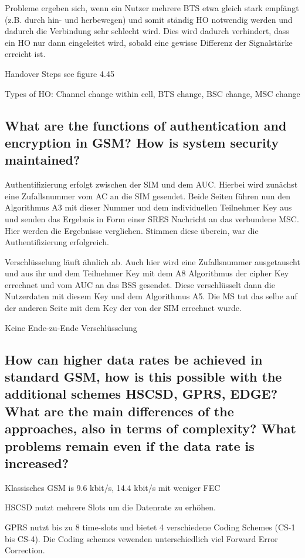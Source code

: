 Probleme ergeben sich, wenn ein Nutzer mehrere BTS etwa gleich stark empfängt (z.B. durch hin- und herbewegen) und somit ständig HO notwendig werden und dadurch die Verbindung sehr schlecht wird. Dies wird dadurch verhindert, dass ein HO nur dann eingeleitet wird, sobald eine gewisse Differenz der Signalstärke erreicht ist.

Handover Steps see figure 4.45

Types of HO: Channel change within cell, BTS change, BSC change, MSC change

\subsection{What are the functions of authentication and encryption in GSM? How is system security maintained?}
Authentifizierung erfolgt zwischen der SIM und dem AUC. Hierbei wird zunächst eine Zufallsnummer vom AC an die SIM gesendet. Beide Seiten führen nun den Algorithmus A3 mit dieser Nummer und dem individuellen Teilnehmer Key aus und senden das Ergebnis in Form einer SRES Nachricht an das verbundene MSC. Hier werden die Ergebnisse verglichen. Stimmen diese überein, war die Authentifizierung erfolgreich.

Verschlüsselung läuft ähnlich ab. Auch hier wird eine Zufallsnummer ausgetauscht und aus ihr und dem Teilnehmer Key mit dem A8 Algorithmus der cipher Key errechnet und vom AUC an das BSS gesendet. Diese verschlüsselt dann die Nutzerdaten mit diesem Key und dem Algorithmus A5. Die MS tut das selbe auf der anderen Seite mit dem Key der von der SIM errechnet wurde.

Keine Ende-zu-Ende Verschlüsselung 

\subsection{How can higher data rates be achieved in standard GSM, how is this possible with the additional schemes HSCSD, GPRS, EDGE? What are the main differences of the approaches, also in terms of complexity? What problems remain even if the data rate is increased?}
Klassisches GSM is 9.6 kbit/s, 14.4 kbit/s mit weniger FEC

HSCSD nutzt mehrere Slots um die Datenrate zu erhöhen.

GPRS nutzt bis zu 8 time-slots und bietet 4 verschiedene Coding Schemes (CS-1 bis CS-4). Die Coding schemes vewenden unterschiedlich viel Forward Error Correction.

